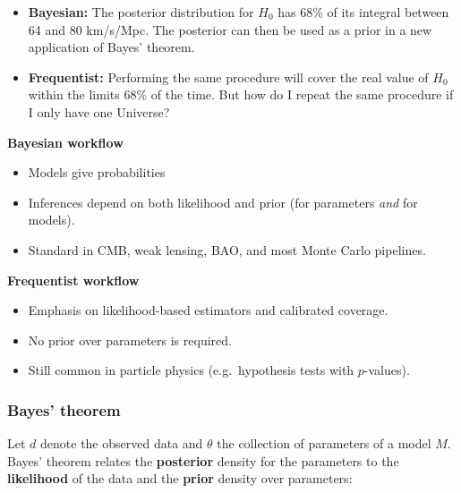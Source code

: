 \begin{exampleblock}[$H_0 = (72 \pm 8)$~km\,s$^{-1}$\,Mpc$^{-1}$]
    \begin{itemize}
        \item \textcolor{red!80!black}{\textbf{Bayesian:}} The posterior distribution for $H_0$ has 68\% of its integral between 64 and 80 km/s/Mpc. The posterior can then be used as a prior in a new application of Bayes' theorem.
        \item \textcolor{blue!80!black}{\textbf{Frequentist:}} Performing the same procedure will cover the real value of $H_0$ within the limits 68\% of the time. But how do I repeat the same procedure if I only have one Universe?
    \end{itemize}
\end{exampleblock}

\begin{minipage}[t]{0.48\textwidth}
    \textbf{Bayesian workflow}
    \begin{itemize}
        \item Models give probabilities
        \item Inferences depend on both likelihood and prior (for parameters \emph{and} for models).
        \item Standard in CMB, weak lensing, BAO, and most Monte Carlo pipelines.
    \end{itemize}
\end{minipage}
\hfill
\begin{minipage}[t]{0.48\textwidth}
    \textbf{Frequentist workflow}
    \begin{itemize}
        \item Emphasis on likelihood-based estimators and calibrated coverage.
        \item No prior over parameters is required.
        \item Still common in particle physics (e.g.\ hypothesis tests with $p$-values).
    \end{itemize}
\end{minipage}

\subsubsection{Bayes' theorem}
\label{sec:bayes_theorem}

Let $d$ denote the observed data and $\theta$ the collection of parameters of a model $M$. Bayes' theorem relates the \textbf{posterior} density for the parameters to the \textbf{likelihood} of the data and the \textbf{prior} density over parameters:

